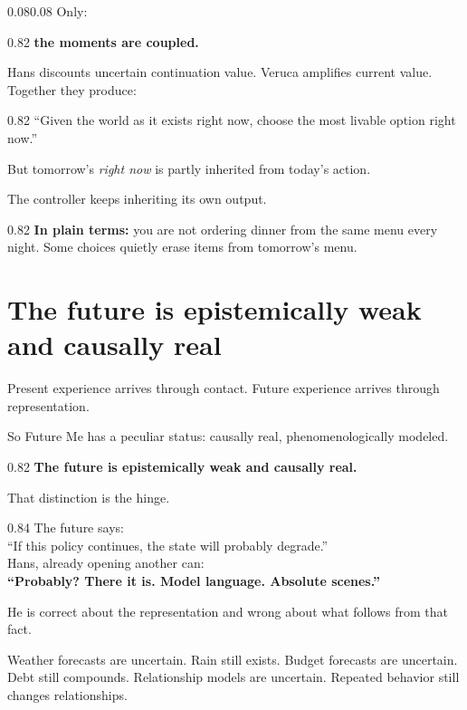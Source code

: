 \documentclass[10pt,letterpaper]{article}
\newenvironment{paperbody}
  {\begin{adjustwidth}{0.08\textwidth}{0.08\textwidth}\justifying}
  {\par\end{adjustwidth}}
\newenvironment{voicebox}
  {\Needspace{3.5\baselineskip}\par\vspace{0.22em}\begin{center}\begingroup
   \begin{lrbox}{\voiceboxsave}\begin{varwidth}{0.82\linewidth}
   \small\rmfamily\upshape\RaggedRight}
  {\end{varwidth}\end{lrbox}\fbox{\usebox{\voiceboxsave}}
   \endgroup\end{center}\vspace{0.22em}}
\newenvironment{dialoguebox}
  {\Needspace{5\baselineskip}\par\vspace{0.26em}\begin{center}\begingroup
   \begin{lrbox}{\dialogueboxsave}\begin{varwidth}{0.84\linewidth}
   \small\rmfamily\upshape\RaggedRight}
  {\end{varwidth}\end{lrbox}\fbox{\usebox{\dialogueboxsave}}
   \endgroup\end{center}\vspace{0.26em}}
\newenvironment{thesisbox}
  {\Needspace{3.5\baselineskip}\par\vspace{0.32em}\begin{center}\begingroup
   \begin{lrbox}{\thesisboxsave}\begin{varwidth}{0.82\linewidth}
   \normalsize\rmfamily\bfseries\upshape\RaggedRight}
  {\end{varwidth}\end{lrbox}\fbox{\usebox{\thesisboxsave}}
   \endgroup\end{center}\vspace{0.32em}}
\newenvironment{plainbox}
  {\Needspace{3.5\baselineskip}\par\vspace{0.24em}\begin{center}\begingroup
   \begin{lrbox}{\plainboxsave}\begin{varwidth}{0.82\linewidth}
   \small\rmfamily\upshape\RaggedRight}
  {\end{varwidth}\end{lrbox}\fbox{\usebox{\plainboxsave}}
   \endgroup\end{center}\vspace{0.24em}}
\let\oldsection\section
\renewcommand{\section}{\Needspace{6\baselineskip}\oldsection}
\begin{document}
\begin{paperbody}
Only:

\begin{voicebox}
\textbf{the moments are coupled.}
\end{voicebox}

Hans discounts uncertain continuation value. Veruca amplifies current
value. Together they produce:

\begin{voicebox}
``Given the world as it exists right now, choose the most livable option
right now.''
\end{voicebox}

But tomorrow's \emph{right now} is partly inherited from today's action.

The controller keeps inheriting its own output.

\begin{plainbox}
\textbf{In plain terms:} you are not ordering dinner from the same menu
every night. Some choices quietly erase items from tomorrow's menu.
\end{plainbox}

\section{The future is epistemically weak and causally
real}\label{the-future-is-epistemically-weak-and-causally-real}

Present experience arrives through contact. Future experience arrives
through representation.

So Future Me has a peculiar status: causally real, phenomenologically
modeled.

\begin{thesisbox}
The future is epistemically weak and causally real.
\end{thesisbox}

That distinction is the hinge.

\begin{dialoguebox}
The future says:\\
``If this policy continues, the state will probably degrade.''\\[0.35em]
Hans, already opening another can:\\
\textbf{``Probably? There it is. Model language. Absolute scenes.''}
\end{dialoguebox}

He is correct about the representation and wrong about what follows from
that fact.

Weather forecasts are uncertain. Rain still exists. Budget forecasts are
uncertain. Debt still compounds. Relationship models are uncertain.
Repeated behavior still changes relationships.


\end{paperbody}
\end{document}
